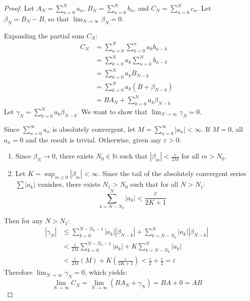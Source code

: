 \documentclass[a4paper]{article}
\begin{document}
\begin{proof}
    Let $A_N = \sum_{n=0}^{N} a_n$, $B_N = \sum_{n=0}^{N} b_n$, and $C_N = \sum_{n=0}^{N} c_n$. Let $\beta_N = B_N - B$, so that $\lim_{N \to \infty} \beta_N = 0$.
    
    Expanding the partial sum $C_N$:
    \begin{align*}
        C_N &= \sum_{n=0}^{N} \sum_{k=0}^{n} a_k b_{n-k} \\
            &= \sum_{k=0}^{N} a_k \sum_{n=k}^{N} b_{n-k} \\
            &= \sum_{k=0}^{N} a_k B_{N-k} \\
            &= \sum_{k=0}^{N} a_k (B + \beta_{N-k}) \\
            &= B A_N + \sum_{k=0}^{N} a_k \beta_{N-k}
    \end{align*}
    Let $\gamma_N = \sum_{k=0}^{N} a_k \beta_{N-k}$. We want to show that $\lim_{N \to \infty} \gamma_N = 0$.
    
    Since $\sum_{n=0}^{\infty} a_n$ is absolutely convergent, let $M = \sum_{n=0}^{\infty} |a_n| < \infty$. If $M = 0$, all $a_n = 0$ and the result is trivial. Otherwise, given any $\varepsilon > 0$:
    \begin{enumerate}
        \item Since $\beta_N \to 0$, there exists $N_0 \in \mathbb{N}$ such that $|\beta_m| < \frac{\varepsilon}{2M}$ for all $m > N_0$.
        \item Let $K = \sup_{m \ge 0} |\beta_m| < \infty$. Since the tail of the absolutely convergent series $\sum |a_k|$ vanishes, there exists $N_1 > N_0$ such that for all $N > N_1$:
        \[
            \sum_{k=N-N_0}^{N} |a_k| < \frac{\varepsilon}{2K + 1}
        \]
    \end{enumerate}
    Then for any $N > N_1$:
    \begin{align*}
        |\gamma_N| &\le \sum_{k=0}^{N-N_0-1} |a_k| |\beta_{N-k}| + \sum_{k=N-N_0}^{N} |a_k| |\beta_{N-k}| \\
                   &< \frac{\varepsilon}{2M} \sum_{k=0}^{N-N_0-1} |a_k| + K \sum_{k=N-N_0}^{N} |a_k| \\
                   &< \frac{\varepsilon}{2M} (M) + K \left(\frac{\varepsilon}{2K+1}\right) < \frac{\varepsilon}{2} + \frac{\varepsilon}{2} = \varepsilon
    \end{align*}
    Therefore $\lim_{N \to \infty} \gamma_N = 0$, which yields:
    \[
        \lim_{N \to \infty} C_N = \lim_{N \to \infty} (B A_N + \gamma_N) = B A + 0 = A B
    \]
\end{proof}
\end{document}
